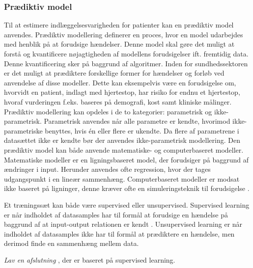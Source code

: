 \subsubsection{Prædiktiv model}
\noindent
Til at estimere indlæggelsesvarigheden for patienter kan en prædiktiv model anvendes.
Prædiktiv modellering definerer en proces, hvor en model udarbejdes med henblik på at forudsige hændelser. Denne model skal gøre det muligt at forstå og kvantificere nøjagtigheden af modellens forudsigelser ift. fremtidig data.\cite{Kuhn2013} Denne kvantificering sker på baggrund af algoritmer. 
Inden for sundhedssektoren er det muligt at prædiktere forskellige former for hændelser og forløb ved anvendelse af disse modeller. Dette kan eksempelvis være en forudsigelse om, hvorvidt en patient, indlagt med hjertestop, har risiko for endnu et hjertestop, hvoraf vurderingen f.eks. baseres på demografi, kost samt kliniske målinger\cite{Hastie2008}. 
Prædiktiv modellering kan opdeles i de to kategorier: parametrisk og ikke-parametrisk. Parametrisk anvendes når alle parametre er kendte, hvorimod ikke-parametriske benyttes, hvis én eller flere er ukendte. Da flere af parametrene i datasættet ikke er kendte bør der anvendes ikke-parametrisk modellering.\cite{Sheskin2000}
Den prædiktiv model kan både anvende matematiske- og computerbaseret modeller. Matematiske modeller er en ligningsbaseret model, der forudsiger på baggrund af ændringer i input. Herunder anvendes ofte regression, hvor der tages udgangspunkt i en lineær sammenhæng. Computerbaseret modeller er modsat ikke baseret på ligninger, denne kræver ofte en simuleringsteknik til forudsigelse \cite{MathWorks2016}.



Et træningssæt kan både være supervised eller unsupervised. Supervised learning er når indholdet af datasamples har til formål at forudsige en hændelse på baggrund af at input-output relationen er kendt \cite{Brownlee2013}. Unsupervised learning er når indholdet af datasamples ikke har til formål at prædiktere en hændelse, men derimod finde en sammenhæng mellem data.\cite{Brownlee2013, Kuhn2013} 

\textit{Lav en afslutning}
, der er baseret på supervised learning. 

